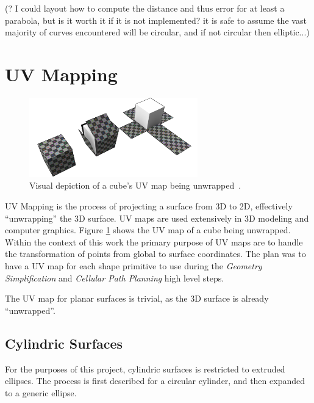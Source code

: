 (? I could layout how to compute the distance and thus error for at least a parabola, but is it worth it if it is not implemented? it is safe to assume the vast majority of curves encountered will be circular, and if not circular then elliptic...)

\section{UV Mapping}
\begin{figure}[htb]
	\centering
	\includegraphics[width=0.65\textwidth]{../resources/cube_UV_unwrapping.png}
	\caption{Visual depiction of a cube's UV map being unwrapped~\cite{UV_map_cube_img}. }
	\label{fig:uv_map_cube}
\end{figure}
UV Mapping is the process of projecting a surface from 3D to 2D, effectively ``unwrapping'' the 3D surface.
UV maps are used extensively in 3D modeling and computer graphics.
Figure \ref{fig:uv_map_cube} shows the UV map of a cube being unwrapped.
Within the context of this work the primary purpose of UV maps are to handle the transformation of points from global to surface coordinates.
The plan was to have a UV map for each shape primitive to use during the \textit{Geometry Simplification} and \textit{Cellular Path Planning} high level steps.

The UV map for planar surfaces is trivial, as the 3D surface is already ``unwrapped''.

\subsection{Cylindric Surfaces}
For the purposes of this project, cylindric surfaces is restricted to extruded ellipses.
The process is first described for a circular cylinder, and then expanded to a generic ellipse.

